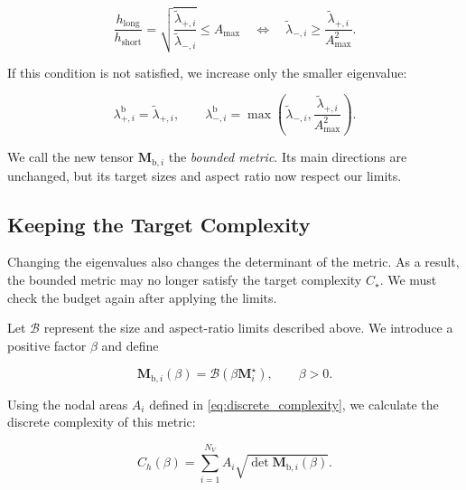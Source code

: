 \documentclass[11pt,a4paper]{article}
\begin{document}
\begin{equation}
    \frac{h_{\mathrm{long}}}{h_{\mathrm{short}}}
    =\sqrt{\frac{\widetilde\lambda_{+,i}}
    {\widetilde\lambda_{-,i}}}
    \leq A_{\max}
    \quad\Longleftrightarrow\quad
    \widetilde\lambda_{-,i}
    \geq\frac{\widetilde\lambda_{+,i}}{A_{\max}^2}.
\end{equation}

\noindent If this condition is not satisfied, we increase
only the smaller eigenvalue:

\begin{equation}
    \label{eq:bounded_aspect_ratio}
    \lambda_{+,i}^{\mathrm b}=\widetilde\lambda_{+,i},
    \qquad
    \lambda_{-,i}^{\mathrm b}
    =\max\!\left(\widetilde\lambda_{-,i},
    \frac{\widetilde\lambda_{+,i}}{A_{\max}^2}\right).
\end{equation}

\noindent We call the new tensor $\mathbf M_{\mathrm b,i}$ the
\emph{bounded metric}. Its main directions are unchanged,
but its target sizes and aspect ratio now respect our limits.

\subsection{Keeping the Target Complexity}

\noindent Changing the eigenvalues also changes the determinant
of the metric. As a result, the bounded metric may no longer
satisfy the target complexity $C_\star$. We must check the
budget again after applying the limits.

\noindent Let $\mathcal B$ represent the size and aspect-ratio
limits described above. We introduce a positive factor $\beta$
and define

\begin{equation}
    \label{eq:bounded_metric_beta}
    \mathbf M_{\mathrm b,i}(\beta)
    =\mathcal B\!\left(\beta\mathbf M_i^\star\right),
    \qquad\beta>0.
\end{equation}

\noindent Using the nodal areas $A_i$ defined in
\eqref{eq:discrete_complexity}, we calculate the discrete
complexity of this metric:

\begin{equation}
    \label{eq:bounded_metric_complexity}
    C_h(\beta)=\sum_{i=1}^{N_V}
    A_i\sqrt{\det\mathbf M_{\mathrm b,i}(\beta)}.
\end{equation}
\end{document}
